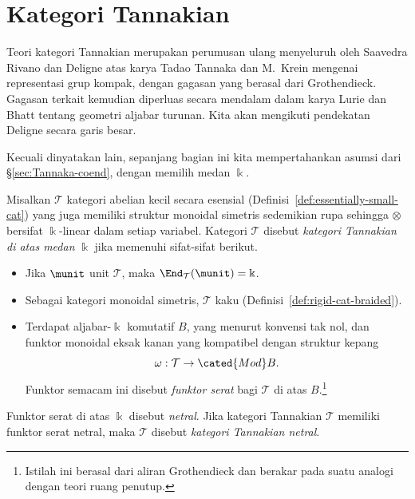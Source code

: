 
\section{Kategori Tannakian}\label{sec:Tannakian-cat}
\hypertarget{o014.aljabr2.chapter9.tannakian-a}{ }
Teori kategori Tannakian merupakan perumusan ulang menyeluruh oleh Saavedra
Rivano dan Deligne \cite{Sa72,Del90} atas karya Tadao Tannaka \cite{Ta38}
dan M.\ Krein \cite{Kr49} mengenai representasi grup kompak, dengan gagasan
yang berasal dari Grothendieck. Gagasan terkait kemudian diperluas secara
mendalam dalam karya Lurie dan Bhatt tentang geometri aljabar turunan. Kita
akan mengikuti pendekatan Deligne secara garis besar.

Kecuali dinyatakan lain, sepanjang bagian ini kita mempertahankan asumsi
dari \S\ref{sec:Tannaka-coend}, dengan memilih medan $\Bbbk$.

\begin{definition}\label{def:Tannakian-cat}
	Misalkan $\mathcal{T}$ kategori abelian kecil secara esensial
	(Definisi~\ref{def:essentially-small-cat}) yang juga memiliki struktur
	monoidal simetris sedemikian rupa sehingga $\otimes$ bersifat
	$\Bbbk$-linear dalam setiap variabel. Kategori $\mathcal{T}$ disebut
	\emph{kategori Tannakian di atas medan $\Bbbk$} jika memenuhi
	sifat-sifat berikut.
	\begin{itemize}
		\item Jika $\munit$ unit $\mathcal{T}$, maka
		$\End_{\mathcal{T}}(\munit)=\Bbbk$.
		\item Sebagai kategori monoidal simetris, $\mathcal{T}$ kaku
		(Definisi~\ref{def:rigid-cat-braided}).
		\item Terdapat aljabar-$\Bbbk$ komutatif $B$, yang menurut konvensi tak
		nol, dan funktor monoidal eksak kanan yang kompatibel dengan struktur
		kepang
		\[ \omega: \mathcal{T} \to \cated{Mod}B. \]
		Funktor semacam ini disebut \emph{funktor serat} bagi $\mathcal{T}$ di atas
		$B$.\footnote{Istilah ini berasal dari aliran Grothendieck dan berakar
		pada suatu analogi dengan teori ruang penutup.}
	\end{itemize}

	Funktor serat di atas $\Bbbk$ disebut \emph{netral}. Jika kategori
	Tannakian $\mathcal{T}$ memiliki funktor serat netral, maka
	$\mathcal{T}$ disebut \emph{kategori Tannakian netral}.
\end{definition}

